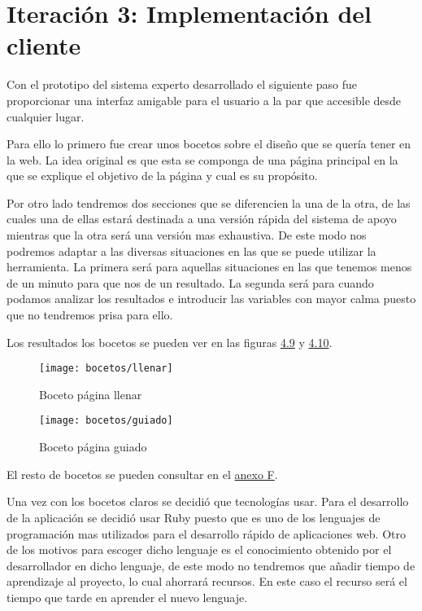 \section{Iteración 3: Implementación del cliente}


Con el prototipo del sistema experto desarrollado el siguiente paso fue
proporcionar una interfaz amigable para el usuario a la par que accesible
desde cualquier lugar.

Para ello lo primero fue crear unos bocetos sobre el diseño que se quería tener
en la web. La idea original es que esta se componga de una página
principal en la que se explique el objetivo de la página y cual es su propósito.

Por otro lado tendremos dos secciones que se diferencien la una de la otra, de las
cuales una de ellas estará destinada a una versión rápida del sistema de apoyo mientras
que la otra será una versión mas exhaustiva. De este modo nos podremos adaptar
a las diversas situaciones en las que se puede utilizar la herramienta.
La primera será para aquellas situaciones en las que tenemos menos de un minuto
para que nos de un resultado. La segunda será para cuando podamos analizar
los resultados e introducir las variables con mayor calma puesto que no
tendremos prisa para ello.

Los resultados los bocetos se pueden ver en las figuras \hyperref[fig:Boceto página llenar]{4.9} y \hyperref[fig:Boceto página guiado]{4.10}.

\begin{figure}[htb]
  \centering
    \texttt{[image: bocetos/llenar]}
  \caption[Boceto página llenar]{Boceto página llenar}
  \label{fig:Boceto página llenar}
\end{figure}

\begin{figure}[htb]
  \centering
    \texttt{[image: bocetos/guiado]}
  \caption[Boceto página guiado]{Boceto página guiado}
  \label{fig:Boceto página guiado}
\end{figure}

El resto de bocetos se pueden consultar en el \hyperref[cap:Bocetos]{anexo F}.

Una vez con los bocetos claros se decidió que tecnologías usar. Para el desarrollo
de la aplicación se decidió usar Ruby puesto que es uno de los lenguajes
de programación mas utilizados para el desarrollo rápido de aplicaciones web.
Otro de los motivos para escoger dicho lenguaje es el conocimiento obtenido
por el desarrollador en dicho lenguaje, de este modo no tendremos que añadir
tiempo de aprendizaje al proyecto, lo cual ahorrará recursos. En este caso el
recurso será el tiempo que tarde en aprender el nuevo lenguaje.

